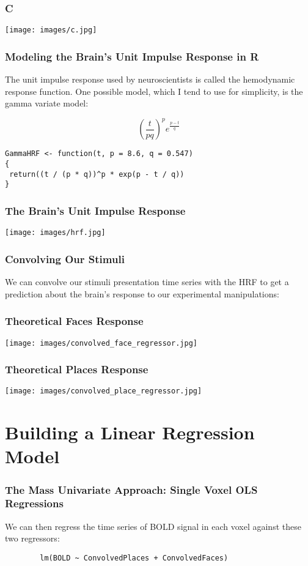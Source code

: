 \documentclass{beamer}
\begin{document}
\frame
{
  \frametitle{C}
  
  \begin{center}
    \texttt{[image: images/c.jpg]}
  \end{center}
}

\begin{frame}[fragile]

  \frametitle{Modeling the Brain's Unit Impulse Response in R}
  
  The unit impulse response used by neuroscientists is called the hemodynamic response function. One possible model, which I tend to use for simplicity, is the gamma variate model:
  
\[
(\frac{t}{pq})^{p} e^{\frac{p - t}{q}}
\]

\begin{verbatim}
GammaHRF <- function(t, p = 8.6, q = 0.547)
{
 return((t / (p * q))^p * exp(p - t / q))
}
\end{verbatim}
\end{frame}

\frame
{
	\frametitle{The Brain's Unit Impulse Response}
  
	\begin{center}
		\texttt{[image: images/hrf.jpg]}
	\end{center}
}

\frame
{
	\frametitle{Convolving Our Stimuli}
	
	We can convolve our stimuli presentation time series with the HRF to get a prediction about the brain's response to our experimental manipulations:
}

\frame
{
	\frametitle{Theoretical Faces Response}
  
	\begin{center}
		\texttt{[image: images/convolved\_face\_regressor.jpg]}
	\end{center}
}

\frame
{
	\frametitle{Theoretical Places Response}
  
	\begin{center}
		\texttt{[image: images/convolved\_place\_regressor.jpg]}
	\end{center}
}

\section{Building a Linear Regression Model}

\begin{frame}[fragile]
	\frametitle{The Mass Univariate Approach: Single Voxel OLS Regressions}
	
	We can then regress the time series of BOLD signal in each voxel against these two regressors:
	
	\begin{verbatim}
		lm(BOLD ~ ConvolvedPlaces + ConvolvedFaces)
	\end{verbatim}
\end{frame}
\end{document}
